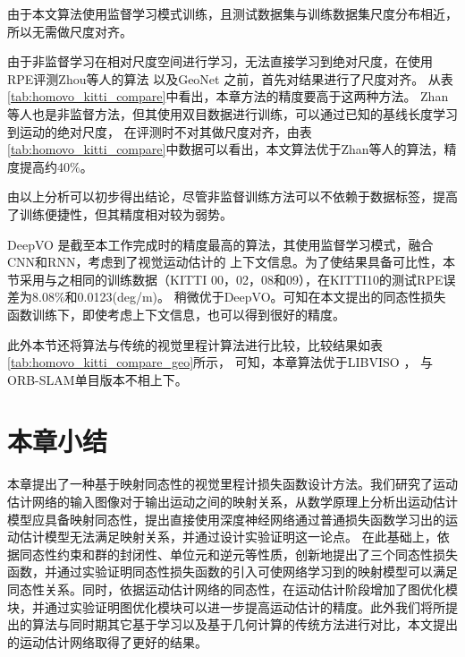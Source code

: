 由于本文算法使用监督学习模式训练，且测试数据集与训练数据集尺度分布相近，所以无需做尺度对齐。

由于非监督学习在相对尺度空间进行学习，无法直接学习到绝对尺度，在使用RPE评测Zhou等人的算法
\cite{zhou2017unsupervised}以及GeoNet \cite{yin2018geonet}之前，首先对结果进行了尺度对齐。
从表\ref{tab:homovo_kitti_compare}中看出，本章方法的精度要高于这两种方法。
Zhan等人\cite{zhan2018unsupervised}也是非监督方法，但其使用双目数据进行训练，可以通过已知的基线长度学习到运动的绝对尺度，
在评测时不对其做尺度对齐，由表\ref{tab:homovo_kitti_compare}中数据可以看出，本文算法优于Zhan等人的算法，精度提高约40\%。

由以上分析可以初步得出结论，尽管非监督训练方法可以不依赖于数据标签，提高了训练便捷性，但其精度相对较为弱势。

DeepVO \cite{wang2017deepvo} 是截至本工作完成时的精度最高的算法，其使用监督学习模式，融合CNN和RNN，考虑到了视觉运动估计的
上下文信息。为了使结果具备可比性，本节采用与之相同的训练数据（KITTI 00，02，08和09），在KITTI10的测试RPE误差为8.08\%和0.0123(deg/m)。
稍微优于DeepVO。可知在本文提出的同态性损失函数训练下，即使考虑上下文信息，也可以得到很好的精度。

此外本节还将算法与传统的视觉里程计算法进行比较，比较结果如表\ref{tab:homovo_kitti_compare_geo}所示，
可知，本章算法优于LIBVISO\cite{Geiger2011IV} ，
与ORB-SLAM单目版本\cite{raul2015orb}不相上下。

\section{本章小结}
\label{sec:homo_conclusion}
本章提出了一种基于映射同态性的视觉里程计损失函数设计方法。我们研究了运动估计网络的输入图像对于输出运动之间的映射关系，从数学原理上分析出运动估计模型应具备映射同态性，提出直接使用深度神经网络通过普通损失函数学习出的运动估计模型无法满足映射关系，并通过设计实验证明这一论点。
在此基础上，依据同态性约束和群的封闭性、单位元和逆元等性质，创新地提出了三个同态性损失函数，并通过实验证明同态性损失函数的引入可使网络学习到的映射模型可以满足同态性关系。同时，依据运动估计网络的同态性，在运动估计阶段增加了图优化模块，并通过实验证明图优化模块可以进一步提高运动估计的精度。此外我们将所提出的算法与同时期其它基于学习以及基于几何计算的传统方法进行对比，本文提出的运动估计网络取得了更好的结果。

